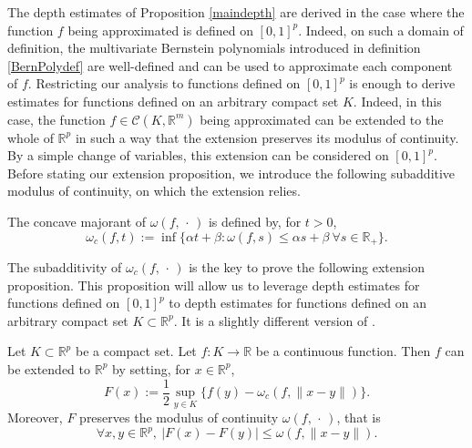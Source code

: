 \documentclass[anon,12pt]{colt2021} %
\begin{document}
The depth estimates of Proposition \ref{maindepth} are derived in the case where the function $f$ being approximated is defined on $[0,1]^{p}$. Indeed, on such a domain of definition, the multivariate Bernstein polynomials introduced in definition \ref{BernPolydef} are well-defined and can be used to approximate each component of $f$. Restricting our analysis to functions defined on $[0,1]^{p}$ is enough to derive estimates for functions defined on an arbitrary compact set $K$. Indeed, in this case, the function $f \in \mathcal{C}(K, \mathbb{R}^{m})$ being approximated can be extended to the whole of $\mathbb{R}^{p}$ in such a way that the extension preserves its modulus of continuity. By a simple change of variables, this extension can be considered on $[0,1]^{p}$. Before stating our extension proposition, we introduce the following subadditive modulus of continuity, on which the extension relies. 

\begin{definition}
The concave majorant of $\omega(f, \, \cdot \,)$ is defined by, for $t>0$,
\begin{equation*}
    \omega_{c}(f,t) := \inf \lbrace \alpha t + \beta: \omega(f,s) \leq \alpha s + \beta \ \forall s \in \mathbb{R}_{+} \rbrace.
\end{equation*}
\end{definition}

The subadditivity of $\omega_{c}(f, \, \cdot \,)$ is the key to prove the following extension proposition. This proposition will allow us to leverage depth estimates for functions defined on $[0,1]^{p}$ to depth estimates for functions defined on an arbitrary compact set $K \subset \mathbb{R}^{p}$. It is a slightly different version of \citep[Corollary 2]{McShane}.

\begin{proposition} \label{ContExt}
Let $K \subset \mathbb{R}^{p}$ be a compact set. Let $f:K \rightarrow \mathbb{R}$ be a continuous function. Then $f$ can be extended to $\mathbb{R}^{p}$ by setting, for $x \in \mathbb{R}^{p}$,
\begin{equation} \label{defext}
    F(x) := \frac{1}{2} \sup_{y \in K} \lbrace f(y) - \omega_{c}(f, \|x-y\|) \rbrace.
\end{equation}
Moreover, $F$ preserves the modulus of continuity $\omega(f, \, \cdot \,)$, that is
\begin{equation} \label{Fmod}
    \forall x, y \in \mathbb{R}^{p}, \ \vert F(x) - F(y) \vert \leq \omega(f, \|x - y \|).
\end{equation}
\end{proposition}
\end{document}
